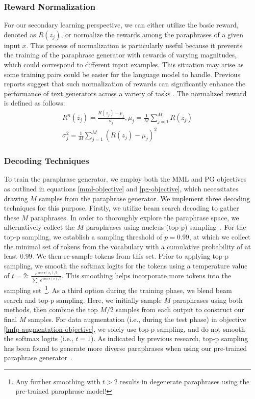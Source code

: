 \documentclass[11pt]{article}
\begin{document}
\subsubsection{Reward Normalization}
For our secondary learning perspective, we can either utilize the basic reward, denoted as $R(z_{j})$, or normalize the rewards among the paraphrases of a given input $x$. This process of normalization is particularly useful because it prevents the training of the paraphrase generator with rewards of varying magnitudes, which could correspond to different input examples. This situation may arise as some training pairs could be easier for the language model to handle. Previous reports suggest that such normalization of rewards can significantly enhance the performance of text generators across a variety of tasks \cite{guo-etal-2022-efficient}. The normalized reward is defined as follows:
\begin{multline}
R^{n}(z_{j}) = \frac{R(z_{j}) - \mu_{j}}{\sigma_{j}}, \mu_{j} = \frac{1}{M} \sum^{M}_{j=1} R(z_{j}) \\
\sigma^{2}_{j} = \frac{1}{M} \sum^{M}_{j=1} (R(z_{j}) - \mu_{j})^2
\label{normal-reward}
\end{multline}

\subsubsection{Decoding Techniques}
To train the paraphrase generator, we employ both the MML and PG objectives as outlined in equations \ref{mml-objective} and \ref{pg-objective}, which necessitates drawing $M$ samples from the paraphrase generator. We implement three decoding techniques for this purpose. Firstly, we utilize beam search decoding to gather these $M$ paraphrases. In order to thoroughly explore the paraphrase space, we alternatively collect the $M$ paraphrases using nucleus (top-p) sampling~\cite{holtzman2020curious}. For the top-p sampling, we establish a sampling threshold of $p=0.99$, at which we collect the minimal set of tokens from the vocabulary with a cumulative probability of at least $0.99$. We then re-sample tokens from this set. Prior to applying top-p sampling, we smooth the softmax logits for the tokens using a temperature value of $t=2$: $\frac{e^{score(v_i)/t}}{\sum_{v} e^{score(v)/t}}$. This smoothing helps incorporate more tokens into the sampling set~\footnote{Any further smoothing with $t>2$ results in degenerate paraphrases using the pre-trained paraphrase model!}. As a third option during the training phase, we blend beam search and top-p sampling. Here, we initially sample $M$ paraphrases using both methods, then combine the top $M/2$ samples from each output to construct our final $M$ samples. For data augmentation (i.e., during the test phase) in objective \ref{lmfp-augmentation-objective}, we solely use top-p sampling, and do not smooth the softmax logits (i.e., $t=1$). As indicated by previous research, top-p sampling has been found to generate more diverse paraphrases when using our pre-trained paraphrase generator~\cite{xu-etal-2020-autoqa}.
\end{document}
